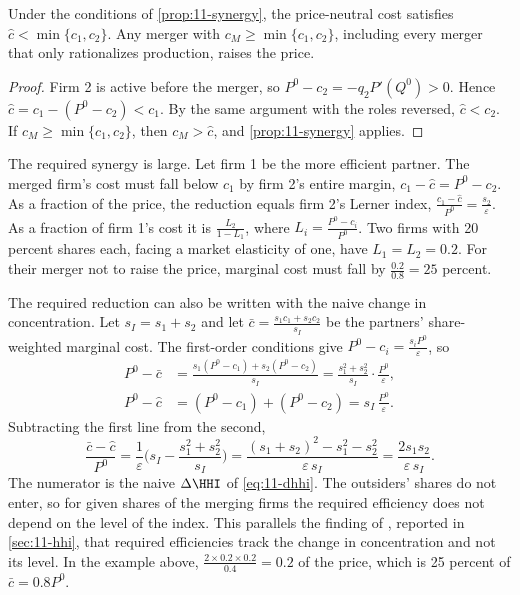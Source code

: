\begin{corollary}\label{prop:11-nosynergy}
Under the conditions of \cref{prop:11-synergy}, the price-neutral cost satisfies $\hat c < \min\{c_1, c_2\}$.
Any merger with $c_M \ge \min\{c_1, c_2\}$, including every merger that only rationalizes production, raises the
price.
\end{corollary}

\begin{proof}
Firm 2 is active before the merger, so $P^0 - c_2 = -q_2 P'(Q^0) > 0$. Hence
$\hat c = c_1 - (P^0 - c_2) < c_1$. By the same argument with the roles reversed, $\hat c < c_2$. If
$c_M \ge \min\{c_1, c_2\}$, then $c_M > \hat c$, and \cref{prop:11-synergy} applies.
\end{proof}

The required synergy is large. Let firm 1 be the more efficient partner. The merged firm's cost must fall below
$c_1$ by firm 2's entire margin, $c_1 - \hat c = P^0 - c_2$. As a fraction of the price, the reduction equals firm
2's Lerner index, $\frac{c_1 - \hat c}{P^0} = \frac{s_2}{\varepsilon}$. As a fraction of firm 1's cost it is
$\frac{L_2}{1 - L_1}$, where $L_i = \frac{P^0 - c_i}{P^0}$. Two firms with 20 percent shares each, facing a market
elasticity of one, have $L_1 = L_2 = 0.2$. For their merger not to raise the price, marginal cost must fall by
$\frac{0.2}{0.8} = 25$ percent.

The required reduction can also be written with the naive change in concentration. Let $s_I = s_1 + s_2$ and let
$\bar c = \frac{s_1 c_1 + s_2 c_2}{s_I}$ be the partners' share-weighted marginal cost. The first-order conditions
give $P^0 - c_i = \frac{s_i P^0}{\varepsilon}$, so
\begin{align*}
P^0 - \bar c &= \frac{s_1(P^0 - c_1) + s_2(P^0 - c_2)}{s_I} = \frac{s_1^2 + s_2^2}{s_I}\cdot\frac{P^0}{\varepsilon},\\
P^0 - \hat c &= (P^0 - c_1) + (P^0 - c_2) = s_I\,\frac{P^0}{\varepsilon}.
\end{align*}
Subtracting the first line from the second,
\begin{equation}\label{eq:11-required-dhhi}
\frac{\bar c - \hat c}{P^0} = \frac{1}{\varepsilon}\Big(s_I - \frac{s_1^2 + s_2^2}{s_I}\Big)
= \frac{(s_1 + s_2)^2 - s_1^2 - s_2^2}{\varepsilon\, s_I} = \frac{2 s_1 s_2}{\varepsilon\, s_I} .
\end{equation}
The numerator is the naive $\Delta\HHI$ of \eqref{eq:11-dhhi}. The outsiders' shares do not enter, so for given
shares of the merging firms the required efficiency does not depend on the level of the index. This parallels the
finding of \citet{NockeWhinston2020}, reported in \cref{sec:11-hhi}, that required efficiencies track the change in
concentration and not its level. In the example above,
$\frac{2 \times 0.2 \times 0.2}{0.4} = 0.2$ of the price, which is 25 percent of $\bar c = 0.8 P^0$.

